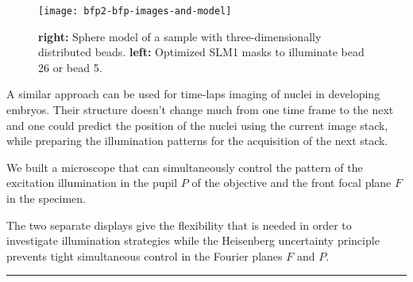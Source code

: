 \documentclass[a4paper, 11pt]{article}
\begin{document}
\begin{multicols}{2}
\begin{figure}[H]
 \centering
 \texttt{[image: bfp2-bfp-images-and-model]}
\caption{{\bf right:} Sphere model of a
  sample with three-dimensionally distributed beads. {\bf left:}
  Optimized SLM1 masks to illuminate bead 26 or bead 5.}
\label{fig:ray}
\end{figure}


A similar approach can be used for time-laps imaging of nuclei in
developing embryos. Their structure doesn't change much from one time
frame to the next and one could predict the position of the nuclei
using the current image stack, while preparing the illumination
patterns for the acquisition of the next stack.


 We built a microscope that can
simultaneously control the pattern of the excitation illumination in
the pupil $P$ of the objective and the front focal plane $F$ in the
specimen.

The two separate displays give the flexibility that is needed in order
to investigate illumination strategies while the Heisenberg
uncertainty principle prevents tight simultaneous control in the
Fourier planes $F$ and $P$.
\end{multicols}

\begin{center}
\rule{0.75\textwidth}{1pt}
\end{center}



\end{document}
